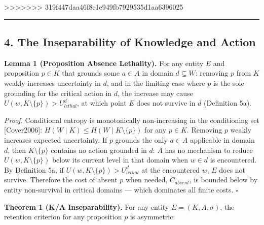 \documentclass[
]{article}
\begin{document}
>>>>>>> 319f447daa46f8c1e949fb7929535d1aa6396025
\begin{center}\rule{0.5\linewidth}{0.5pt}\end{center}

\subsection{4. The Inseparability of Knowledge and
Action}\label{the-inseparability-of-knowledge-and-action}

\textbf{Lemma 1 (Proposition Absence Lethality).} For any entity \(E\)
and proposition \(p \in K\) that grounds some \(a \in A\) in domain
\(d \subseteq W\): removing \(p\) from \(K\) weakly increases
uncertainty in \(d\), and in the limiting case where \(p\) is the sole
grounding for the critical action in \(d\), the increase may cause
\(U(w, K \setminus \{p\}) > U_{lethal}^d\), at which point \(E\) does
not survive in \(d\) (Definition 5a).

\emph{Proof.} Conditional entropy is monotonically non-increasing in the
conditioning set {[}Cover2006{]}:
\(H(W \mid K) \leq H(W \mid K \setminus \{p\})\) for any \(p \in K\).
Removing \(p\) weakly increases expected uncertainty. If \(p\) grounds
the only \(a \in A\) applicable in domain \(d\), then
\(K \setminus \{p\}\) contains no action grounded in \(d\): \(A\) has no
mechanism to reduce \(U(w, K \setminus \{p\})\) below its current level
in that domain when \(w \in d\) is encountered. By Definition 5a, if
\(U(w, K \setminus \{p\}) > U_{lethal}^d\) at the encountered \(w\),
\(E\) does not survive. Therefore the cost of absent \(p\) when needed,
\(C_{absent}\), is bounded below by entity non-survival in critical
domains --- which dominates all finite costs. \(\square\)

\textbf{Theorem 1 (K/A Inseparability).} For any entity
\(E = (K, A, \sigma)\), the retention criterion for any proposition
\(p\) is asymmetric:
\end{document}
